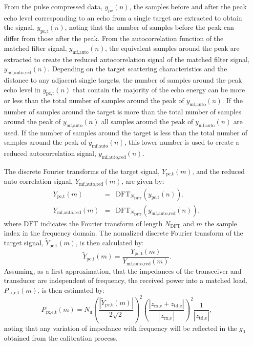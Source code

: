 \documentclass[preprint,12pt,TurnOnLineNumbers]{JASAnew}
\newcommand{\samplesymt}{n}
\newcommand{\samplesymf}{m}
\newcommand{\nchannels}{N_{\textrm{u}}}
\newcommand{\zrxe}{z_{\textrm{rx,e}}}
\newcommand{\ztde}{z_{\textrm{td,e}}}
\newcommand{\ypc}{y_{\textrm{pc}}}
\newcommand{\ypctarget}{y_{\textrm{pc,t}}}
\newcommand{\ymfauto}{y_{\textrm{mf,auto}}}
\newcommand{\ymfautored}{y_{\textrm{mf,auto,red}}}
\newcommand{\ypctargetf}{Y_{\textrm{pc,t}}}
\newcommand{\ypctargetnormf}{\tilde{Y}_{\textrm{pc,t}}}
\newcommand{\ymfautoredf}{Y_{\textrm{mf,auto,red}}}
\newcommand{\prxetf}{P_{\textrm{rx,e,t}}}
\newcommand{\gainzero}{g_0}
\newcommand{\dft}{\textrm{DFT}}
\newcommand{\ndft}{{N_{\textrm{DFT}}}}
\begin{document}
From the pulse compressed data, $\ypc(\samplesymt)$, the samples before and after the peak echo level corresponding to an echo from a single target are extracted to obtain the signal, $\ypctarget(\samplesymt)$, noting that the number of samples before the peak can differ from those after the peak. From the autocorrelation function of the matched filter signal, $\ymfauto(\samplesymt)$, the equivalent samples around the peak are extracted to create the reduced autocorrelation signal of the matched filter signal, $\ymfautored(\samplesymt)$. Depending on the target scattering characteristics and the distance to any adjacent single targets, the number of samples around the peak echo level in $\ypctarget(\samplesymt)$ that contain the majority of the echo energy can be more or less than the total number of samples around the peak of $\ymfauto(\samplesymt)$. If the number of samples around the target is more than the total number of samples around the peak of $\ymfauto(\samplesymt)$ all samples around the peak of $\ymfauto(\samplesymt)$ are used. If the number of samples around the target is less than the total number of samples around the peak of $\ymfauto(\samplesymt)$, this lower number is used to create a reduced autocorrelation signal, $\ymfautored(\samplesymt)$.

The discrete Fourier transforms of the target signal, $\ypctargetf(\samplesymf)$, and the reduced auto correlation signal, $\ymfautoredf(\samplesymf)$, are given by:
\begin{eqnarray}
\label{eq:DFT_Target_Auto}
\ypctargetf(\samplesymf) & = & \dft_\ndft(\ypctarget(\samplesymt)),\\
\ymfautoredf(\samplesymf) & = & \dft_\ndft(\ymfautored(\samplesymt)),
\end{eqnarray}
where $\dft$ indicates the Fourier transform of length $\ndft$ and $\samplesymf$ the sample index in the frequency domain.
The nomalized discrete Fourier transform of the target signal, $\ypctargetnormf(\samplesymf)$, is then calculated by: 
%
\begin{equation}
\label{eq:DFT_Target_Auto_Norm}
\ypctargetnormf(\samplesymf) = \frac{\ypctargetf(\samplesymf)} {\ymfautoredf(\samplesymf)}.
\end{equation}
%
Assuming, as a first approximation, that the impedances of the transceiver and transducer are independent of frequency, the received power into a matched load, $\prxetf(\samplesymf)$, is then estimated by:
\begin{equation}
\label{eq:prx_FFT_target}
\prxetf(\samplesymf) = \nchannels\left( \frac{|\ypctargetnormf(\samplesymf)|}{2\sqrt{2}} \right)^2 
\left( \frac{|\zrxe+\ztde|}{|\zrxe|}\right)^2 \frac{1}{|\ztde|}, %
\end{equation}
%
noting that any variation of impedance with frequency will be reflected in the $\gainzero$ obtained from the calibration process.
\end{document}
